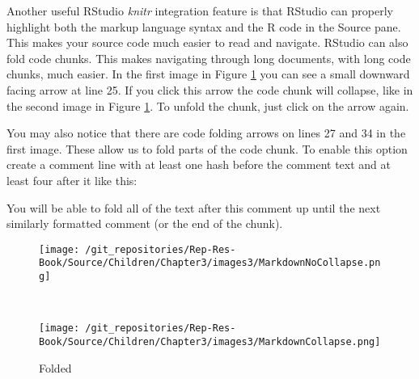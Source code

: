 {{Another useful RStudio {\emph{knitr}} integration feature is that RStudio can properly highlight both the markup language syntax and the R code in the Source pane. This makes your source code much easier to read and navigate. RStudio can also fold code chunks. This makes navigating through long documents, with long code chunks, much easier. In the first image in Figure \ref{CodeFold} you can see a small downward facing arrow at line 25. If you click this arrow the code chunk will collapse, like in the second image in Figure \ref{CodeFold}. To unfold the chunk, just click on the arrow again.

You may also notice that there are code folding arrows on lines 27 and 34 in the first image. These allow us to fold parts of the code chunk. To enable this option create a comment line with at least one hash before the comment text and at least four after it like this:

\begin{knitrout}
\color{fgcolor}\begin{kframe}
\begin{alltt}
\end{alltt}
\end{kframe}
\end{knitrout}


\noindent You will be able to fold all of the text after this comment up until the next similarly formatted comment (or the end of the chunk).

\begin{figure}[ht!]
    \caption{Folding Code Chunks in RStudio}
    \label{CodeFold}
    \begin{center}
    \begin{subfigure}  
        \caption{Not Folded}   \texttt{[image: /git\_repositories/Rep-Res-Book/Source/Children/Chapter3/images3/MarkdownNoCollapse.png]}
    \end{subfigure} \\[0.5cm]
    
    \begin{subfigure}
        \caption{Folded}
      \texttt{[image: /git\_repositories/Rep-Res-Book/Source/Children/Chapter3/images3/MarkdownCollapse.png]}        
    \end{subfigure}
    \end{center}
\end{figure}

}}
